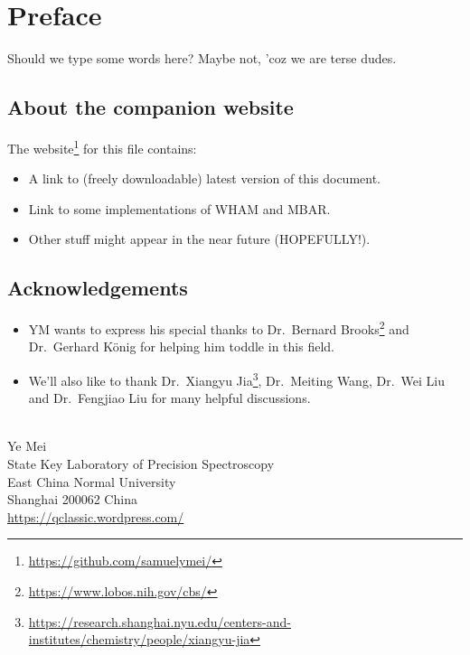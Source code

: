 \chapter*{Preface}
Should we type some words here? Maybe not, 'coz we are terse dudes.

\section*{About the companion website}
The website\footnote{\url{https://github.com/samuelymei/}} for this file contains:
\begin{itemize}
  \item A link to (freely downloadable) latest version of this document.
  \item Link to some implementations of WHAM and MBAR.
  \item Other stuff might appear in the near future (HOPEFULLY!).
\end{itemize}

\section*{Acknowledgements}
\begin{itemize}
\item YM wants to express his special thanks to Dr.~Bernard Brooks\footnote{\url{https://www.lobos.nih.gov/cbs/}} and Dr.~Gerhard K\"onig for helping him toddle in this field.
\item We'll also like to thank Dr.~Xiangyu Jia\footnote{\url{https://research.shanghai.nyu.edu/centers-and-institutes/chemistry/people/xiangyu-jia}}, Dr.~Meiting Wang, Dr.~Wei Liu and Dr.~Fengjiao Liu for many helpful discussions.
\end{itemize}
\mbox{}\\
\noindent Ye Mei \\
\noindent State Key Laboratory of Precision Spectroscopy\\
\noindent East China Normal University\\
\noindent Shanghai 200062 China\\
\noindent \url{https://qclassic.wordpress.com/}
